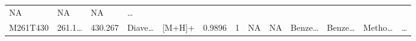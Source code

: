 \documentclass[
]{article}
\begin{document}
\begin{longtable}[]{@{}lllllllllllll@{}}
\begin{minipage}[t]{0.05\columnwidth}
NA\strut
\end{minipage} & \begin{minipage}[t]{0.05\columnwidth}\raggedright
NA\strut
\end{minipage} & \begin{minipage}[t]{0.05\columnwidth}\raggedright
NA\strut
\end{minipage} & \begin{minipage}[t]{0.02\columnwidth}\raggedright
\ldots{}\strut
\end{minipage}\tabularnewline
\begin{minipage}[t]{0.05\columnwidth}\raggedright
M261T430\strut
\end{minipage} & \begin{minipage}[t]{0.05\columnwidth}\raggedright
261.1\ldots{}\strut
\end{minipage} & \begin{minipage}[t]{0.05\columnwidth}\raggedright
430.267\strut
\end{minipage} & \begin{minipage}[t]{0.05\columnwidth}\raggedright
Diave\ldots{}\strut
\end{minipage} & \begin{minipage}[t]{0.05\columnwidth}\raggedright
{[}M+H{]}+\strut
\end{minipage} & \begin{minipage}[t]{0.07\columnwidth}\raggedright
0.9896\strut
\end{minipage} & \begin{minipage}[t]{0.07\columnwidth}\raggedright
1\strut
\end{minipage} & \begin{minipage}[t]{0.05\columnwidth}\raggedright
NA\strut
\end{minipage} & \begin{minipage}[t]{0.04\columnwidth}\raggedright
NA\strut
\end{minipage} & \begin{minipage}[t]{0.05\columnwidth}\raggedright
Benze\ldots{}\strut
\end{minipage} & \begin{minipage}[t]{0.05\columnwidth}\raggedright
Benze\ldots{}\strut
\end{minipage} & \begin{minipage}[t]{0.05\columnwidth}\raggedright
Metho\ldots{}\strut
\end{minipage} & \begin{minipage}[t]{0.02\columnwidth}\raggedright
\ldots{}\strut

\end{minipage}
\end{longtable}
\end{document}
